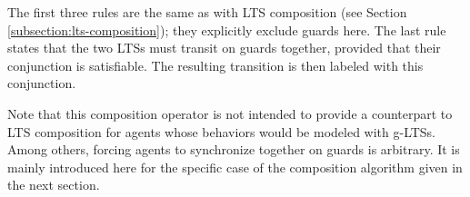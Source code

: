 The first three rules are the same as with LTS composition (see Section \ref{subsection:lts-composition}); they explicitly exclude guards here. The last rule states that the two LTSs must transit on guards together, provided that their conjunction is satisfiable. The resulting transition is then labeled with this conjunction.

Note that this composition operator is not intended to provide a counterpart to LTS composition for agents whose behaviors would be modeled with g-LTSs. Among others, forcing agents to synchronize together on guards is arbitrary. It is mainly introduced here for the specific case of the composition algorithm given in the next section.
